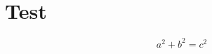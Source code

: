 \documentclass{article}
\begin{document}
\section{Test}\lipsum[1-150]\textbf{\lipsum[1-30]}\textit{\lipsum[1-30]}
\[ a^2+b^2=c^2 \]
\end{document}
